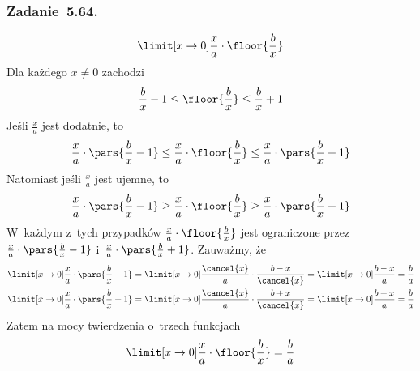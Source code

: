 \subsubsection*{Zadanie~5.64.}
\begin{equation*}
    \limit[x \to 0] \frac{x}{a} \cdot \floor{\frac{b}{x}}
\end{equation*}
Dla każdego \(x \neq 0\) zachodzi
\begin{equation*}
    \frac{b}{x} - 1 \leq \floor{\frac{b}{x}} \leq \frac{b}{x} + 1
\end{equation*}
Jeśli \(\frac{x}{a}\) jest dodatnie, to
\begin{equation*}
    \frac{x}{a} \cdot \pars{\frac{b}{x} - 1} \leq \frac{x}{a} \cdot \floor{\frac{b}{x}} \leq \frac{x}{a} \cdot \pars{\frac{b}{x} + 1}
\end{equation*}
Natomiast jeśli \(\frac{x}{a}\) jest ujemne, to
\begin{equation*}
    \frac{x}{a} \cdot \pars{\frac{b}{x} - 1} \geq \frac{x}{a} \cdot \floor{\frac{b}{x}} \geq \frac{x}{a} \cdot \pars{\frac{b}{x} + 1}
\end{equation*}
W~każdym z~tych przypadków \(\frac{x}{a} \cdot \floor{\frac{b}{x}}\) jest ograniczone przez \(\frac{x}{a} \cdot \pars{\frac{b}{x} - 1}\) i~\(\frac{x}{a} \cdot \pars{\frac{b}{x} + 1}\). Zauważmy, że
\begin{gather*}
    \limit[x \to 0] \frac{x}{a} \cdot \pars{\frac{b}{x} - 1}
        = \limit[x \to 0] \frac{\cancel{x}}{a} \cdot \frac{b - x}{\cancel{x}}
        = \limit[x \to 0] \frac{b - x}{a}
        = \frac{b}{a}\\
    \limit[x \to 0] \frac{x}{a} \cdot \pars{\frac{b}{x} + 1}
        = \limit[x \to 0] \frac{\cancel{x}}{a} \cdot \frac{b + x}{\cancel{x}}
        = \limit[x \to 0] \frac{b + x}{a}
        = \frac{b}{a}
\end{gather*}
Zatem na mocy twierdzenia o~trzech funkcjach
\begin{equation*}
    \limit[x \to 0] \frac{x}{a} \cdot \floor{\frac{b}{x}} = \frac{b}{a}
\end{equation*}
